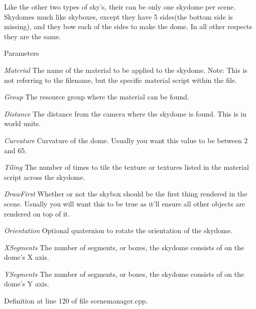 Like the other two types of sky's, their can be only one skydome per scene. Skydomes much like skyboxes, except they have 5 sides(the bottom side is missing), and they bow each of the sides to make the dome. In all other respects they are the same. 
\begin{DoxyParams}{Parameters}
\item[{\em Material}]The name of the material to be applied to the skydome. Note: This is not referring to the filename, but the specific material script within the file. \item[{\em Group}]The resource group where the material can be found. \item[{\em Distance}]The distance from the camera where the skydome is found. This is in world units. \item[{\em Curvature}]Curvature of the dome. Usually you want this value to be between 2 and 65. \item[{\em Tiling}]The number of times to tile the texture or textures listed in the material script across the skydome. \item[{\em DrawFirst}]Whether or not the skybox should be the first thing rendered in the scene. Usually you will want this to be true as it'll ensure all other objects are rendered on top of it. \item[{\em Orientation}]Optional quaternion to rotate the orientation of the skydome. \item[{\em XSegments}]The number of segments, or boxes, the skydome consists of on the dome's X axis. \item[{\em YSegments}]The number of segments, or boxes, the skydome consists of on the dome's Y axis. \end{DoxyParams}


Definition at line 120 of file scenemanager.cpp.

